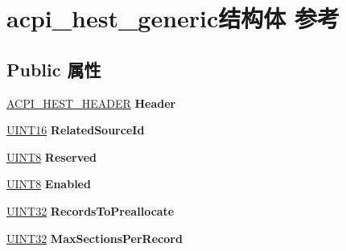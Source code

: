 \hypertarget{structacpi__hest__generic}{}\section{acpi\+\_\+hest\+\_\+generic结构体 参考}
\label{structacpi__hest__generic}
\subsection*{Public 属性}
\begin{DoxyCompactItemize}
\item 
\mbox{\label{structacpi__hest__generic_a48b9812415c00d09cf07863afb9334c1}} 
\hyperlink{structacpi__hest__header}{A\+C\+P\+I\+\_\+\+H\+E\+S\+T\+\_\+\+H\+E\+A\+D\+ER} {\bfseries Header}
\item 
\mbox{\label{structacpi__hest__generic_ae4b0c0ef4ad2c1b15c0aab039746326d}} 
\hyperlink{_processor_bind_8h_a09f1a1fb2293e33483cc8d44aefb1eb1}{U\+I\+N\+T16} {\bfseries Related\+Source\+Id}
\item 
\mbox{\label{structacpi__hest__generic_aac88d6c456c23d6924afab0dba37815b}} 
\hyperlink{_processor_bind_8h_ab27e9918b538ce9d8ca692479b375b6a}{U\+I\+N\+T8} {\bfseries Reserved}
\item 
\mbox{\label{structacpi__hest__generic_a55083151ddad5b74157d8958b38d19cf}} 
\hyperlink{_processor_bind_8h_ab27e9918b538ce9d8ca692479b375b6a}{U\+I\+N\+T8} {\bfseries Enabled}
\item 
\mbox{\label{structacpi__hest__generic_a54d0eb591b040b024d60eea5bc70c7ce}} 
\hyperlink{_processor_bind_8h_ae1e6edbbc26d6fbc71a90190d0266018}{U\+I\+N\+T32} {\bfseries Records\+To\+Preallocate}
\item 
\mbox{\label{structacpi__hest__generic_a7e0b9b02b8608cd9b556bacde0b0c61f}} 
\hyperlink{_processor_bind_8h_ae1e6edbbc26d6fbc71a90190d0266018}{U\+I\+N\+T32} {\bfseries Max\+Sections\+Per\+Record}
\item 
\mbox{\label{structacpi__hest__generic_a86af69e6e661e3f3a502e1be47fb9996}} 

\end{DoxyCompactItemize}
